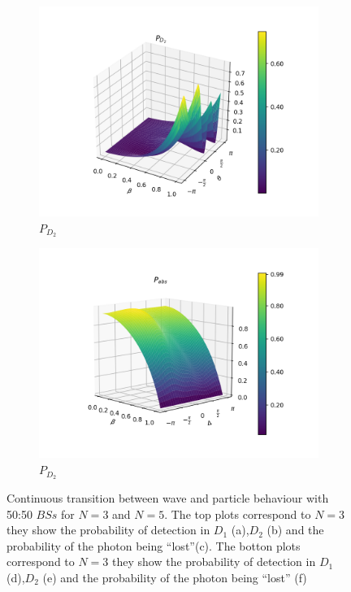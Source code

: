 \documentclass{book}
\begin{document}
\begin{figure}[H]
\begin{subfigure}[b]{0.30\linewidth}
\includegraphics[width=\linewidth]{images/pd2_5_pi4.png}
\caption{$P_{D_{2}}$ }
\label{fig:BS1}
\end{subfigure}
\begin{subfigure}[b]{0.30\linewidth}
\includegraphics[width=\linewidth]{images/pabs_5_pi4.png}
\caption{$P_{D_{2}}$ }
\label{fig:BS1}
\end{subfigure}
\caption{Continuous transition between wave and particle behaviour with 50:50 $BSs$ for $N=3$ and $N=5$. The top plots correspond to $N=3$ they show the probability of detection in $D_{1}$ (a),$D_{2}$ (b) and the probability of the photon being ``lost''(c). The botton plots correspond to $N=3$ they show the probability of detection in $D_{1}$ (d),$D_{2}$ (e) and the probability of the photon being ``lost'' (f)}
\label{varias}
\end{figure}
\end{document}
